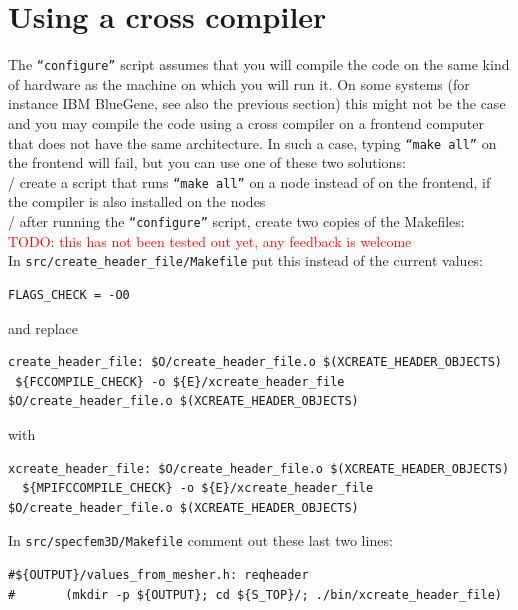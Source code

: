 \documentclass[oneside,english]{book}
\newcommand{\red}[1]{\textcolor{Red}{#1}}
\begin{document}
\section{Using a cross compiler}

The \texttt{``configure''} script assumes that you will compile the code on the same kind of hardware
as the machine on which you will run it. On some systems (for instance IBM BlueGene, see also the previous section) this might not be the case
and you may compile the code using a cross compiler on a frontend computer that does not have the same
architecture. In such a case, typing \texttt{``make all''} on the frontend will fail, but you can use one of these two solutions: \\

/ create a script that runs \texttt{``make all''} on a node instead of on the frontend, if the compiler is also installed on the nodes \\

/ after running the \texttt{``configure''} script, create two copies of the Makefiles:
\\
\red{TODO: this has not been tested out yet, any feedback is welcome}
\\

\noindent
In \texttt{src/create\_header\_file/Makefile} put this instead of the current values:

\begin{verbatim}
FLAGS_CHECK = -O0
\end{verbatim}

\noindent
and replace

\begin{verbatim}
create_header_file: $O/create_header_file.o $(XCREATE_HEADER_OBJECTS)
 ${FCCOMPILE_CHECK} -o ${E}/xcreate_header_file $O/create_header_file.o $(XCREATE_HEADER_OBJECTS)
\end{verbatim}

\noindent
with

\begin{verbatim}
xcreate_header_file: $O/create_header_file.o $(XCREATE_HEADER_OBJECTS)
  ${MPIFCCOMPILE_CHECK} -o ${E}/xcreate_header_file $O/create_header_file.o $(XCREATE_HEADER_OBJECTS)
\end{verbatim}

\noindent
In \texttt{src/specfem3D/Makefile} comment out these last two lines:

\begin{verbatim}
#${OUTPUT}/values_from_mesher.h: reqheader
#       (mkdir -p ${OUTPUT}; cd ${S_TOP}/; ./bin/xcreate_header_file)
\end{verbatim}
\end{document}

